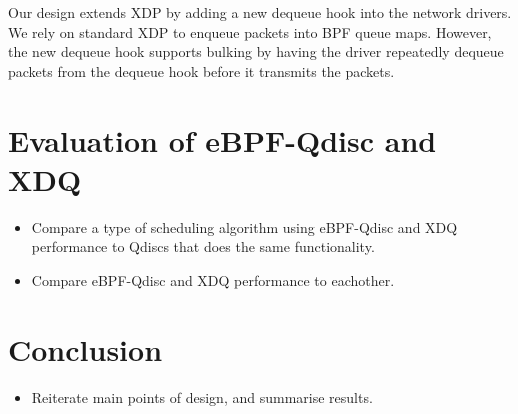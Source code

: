 \documentclass[sigconf, nonacm]{acmart}
\begin{document}

Our design extends XDP by adding a new dequeue hook into the network drivers. We
rely on standard XDP to enqueue packets into BPF queue maps. However, the new
dequeue hook supports bulking by having the driver repeatedly dequeue packets
from the dequeue hook before it transmits the packets.


\section{Evaluation of eBPF-Qdisc and XDQ}

\begin{itemize}
  \item Compare a type of scheduling algorithm using eBPF-Qdisc and XDQ performance to Qdiscs that does the same functionality.
  \item Compare eBPF-Qdisc and XDQ performance to eachother.
\end{itemize}

\section{Conclusion}

\begin{itemize}
  \item Reiterate main points of design, and summarise results.
\end{itemize}





\end{document}
